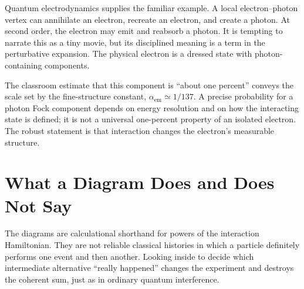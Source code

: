 \begin{classroomqa}
\end{classroomqa}

Quantum electrodynamics supplies the familiar example. A local electron--photon vertex can annihilate an electron, recreate an electron, and create a photon. At second order, the electron may emit and reabsorb a photon. It is tempting to narrate this as a tiny movie, but its disciplined meaning is a term in the perturbative expansion. The physical electron is a dressed state with photon-containing components.

The classroom estimate that this component is ``about one percent'' conveys the scale set by the fine-structure constant, \(\alpha_{\mathrm{em}}\simeq 1/137\). A precise probability for a photon Fock component depends on energy resolution and on how the interacting state is defined; it is not a universal one-percent property of an isolated electron. The robust statement is that interaction changes the electron's measurable structure.

\section{What a Diagram Does and Does Not Say}

The diagrams are calculational shorthand for powers of the interaction Hamiltonian. They are not reliable classical histories in which a particle definitely performs one event and then another. Looking inside to decide which intermediate alternative ``really happened'' changes the experiment and destroys the coherent sum, just as in ordinary quantum interference.

\begin{classroomqa}
\end{classroomqa}


